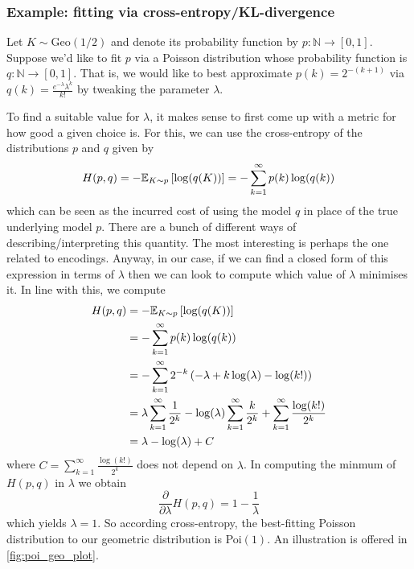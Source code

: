\documentclass[11pt]{article}
\begin{document}
\begin{appendices}
\subsubsection*{Example: fitting via cross-entropy/KL-divergence}

Let $K\sim\text{Geo}(1/2)$ and denote its probability function by $p:\mathbb{N}\to[0,1]$. Suppose we'd like to fit $p$ via a Poisson distribution whose probability function is $q:\mathbb{N}\to[0,1]$. That is, we would like to best approximate $p(k)=2^{-(k+1)}$ via $q(k)=\frac{e^{-\lambda}\lambda^k}{k!}$ by tweaking the parameter $\lambda$.

To find a suitable value for $\lambda$, it makes sense to first come up with a metric for how good a given choice is. For this, we can use the cross-entropy of the distributions $p$ and $q$ given by
$$
H(p,q)
=
-\mathbb{E}_{K\sim p}\left[\log(q(K))\right]
=
-\sum_{k=1}^{\infty}p(k)\log(q(k))
$$
which can be seen as the incurred cost of using the model $q$ in place of the true underlying model $p$. There are a bunch of different ways of describing/interpreting this quantity. The most interesting is perhaps the one related to encodings. Anyway, in our case, if we can find a closed form of this expression in terms of $\lambda$ then we can look to compute which value of $\lambda$ minimises it. In line with this, we compute
\begin{align*}
    H(p,q)
    &=
    -\mathbb{E}_{K\sim p}\left[\log(q(K))\right]\\
    &=
    -\sum_{k=1}^{\infty}p(k)\log(q(k))\\
    &=
    -\sum_{k=1}^{\infty}2^{-k}\left(-\lambda+k\log(\lambda)-\log(k!)\right)\\
    &=
    \lambda\sum_{k=1}^{\infty}\frac{1}{2^k}-\log(\lambda)\sum_{k=1}^{\infty}\frac{k}{2^k}+\sum_{k=1}^{\infty}\frac{\log(k!)}{2^k}\\
    &=
    \lambda-\log(\lambda)+C
\end{align*}
where $C=\sum_{k=1}^{\infty}\frac{\log(k!)}{2^k}$ does not depend on $\lambda$. In computing the minmum of $H(p,q)$ in $\lambda$ we obtain
$$
\frac{\partial}{\partial \lambda}H(p,q)
=
1-\frac{1}{\lambda}
$$
which yields $\lambda=1$. So according cross-entropy, the best-fitting Poisson distribution to our geometric distribution is Poi$(1)$. An illustration is offered in \autoref{fig:poi_geo_plot}.


\end{appendices}
\end{document}
